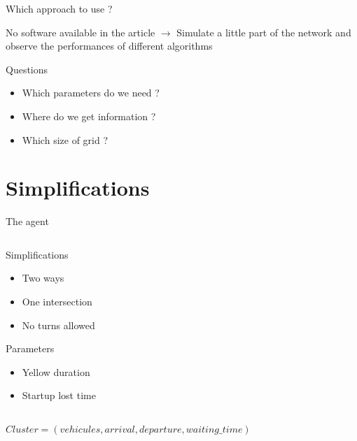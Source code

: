 \documentclass[]{beamer}
\begin{document}
\begin{frame}{Which approach to use ?}
 \begin{block}{No software available in the article}
 $\rightarrow$ Simulate a little part of the network and observe the performances of different algorithms
 \end{block}
 
 \begin{block}{Questions}
  \begin{itemize}
   \item Which parameters do we need ?
   \item Where do we get information ?
   \item Which size of grid ?
  \end{itemize} 
 \end{block}
\end{frame}


\section{Simplifications}
\begin{frame}{The agent}

 \begin{columns}
  \begin{column}[c]{4cm}
  Simplifications
   \begin{itemize}
    \item Two ways
    \item One intersection
    \item No turns allowed
   \end{itemize}
   Parameters
   \begin{itemize}
    \item Yellow duration
    \item Startup lost time
   \end{itemize}
  \end{column}
  \begin{column}[c]{6cm}
   \begin{figure}
   \end{figure}
  \end{column}
 \end{columns}
 \vspace{1cm}
 
 \centering
 $Cluster = (vehicules, arrival, departure, waiting\_time)$
\end{frame}
\end{document}
